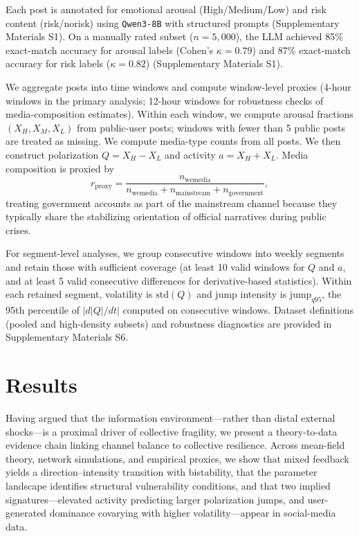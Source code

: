 \documentclass[11pt]{article}
\begin{document}
Each post is annotated for emotional arousal (High/Medium/Low) and risk content (risk/norisk) using \texttt{Qwen3-8B} \citep{Qwen3_8B} with structured prompts (Supplementary Materials S1). On a manually rated subset ($n=5{,}000$), the LLM achieved 85\% exact-match accuracy for arousal labels (Cohen's $\kappa=0.79$) and 87\% exact-match accuracy for risk labels ($\kappa=0.82$) (Supplementary Materials S1).

We aggregate posts into time windows and compute window-level proxies (4-hour windows in the primary analysis; 12-hour windows for robustness checks of media-composition estimates). Within each window, we compute arousal fractions $(X_H,X_M,X_L)$ from public-user posts; windows with fewer than 5 public posts are treated as missing. We compute media-type counts from all posts. We then construct polarization $Q=X_H-X_L$ and activity $a=X_H+X_L$. Media composition is proxied by
\begin{equation}
r_{\text{proxy}}=\frac{n_{\text{wemedia}}}{n_{\text{wemedia}}+n_{\text{mainstream}}+n_{\text{government}}},
\label{eq:rproxy}
\end{equation}
treating government accounts as part of the mainstream channel because they typically share the stabilizing orientation of official narratives during public crises.

For segment-level analyses, we group consecutive windows into weekly segments and retain those with sufficient coverage (at least 10 valid windows for $Q$ and $a$, and at least 5 valid consecutive differences for derivative-based statistics). Within each retained segment, volatility is $\text{std}(Q)$ and jump intensity is $\text{jump}_{q95}$, the 95th percentile of $|d|Q|/dt|$ computed on consecutive windows. Dataset definitions (pooled and high-density subsets) and robustness diagnostics are provided in Supplementary Materials S6.

\FloatBarrier
\section{Results}
\noindent Having argued that the information environment---rather than distal external shocks---is a proximal driver of collective fragility, we present a theory-to-data evidence chain linking channel balance to collective resilience. Across mean-field theory, network simulations, and empirical proxies, we show that mixed feedback yields a direction--intensity transition with bistability, that the parameter landscape identifies structural vulnerability conditions, and that two implied signatures---elevated activity predicting larger polarization jumps, and user-generated dominance covarying with higher volatility---appear in social-media data.
\end{document}
